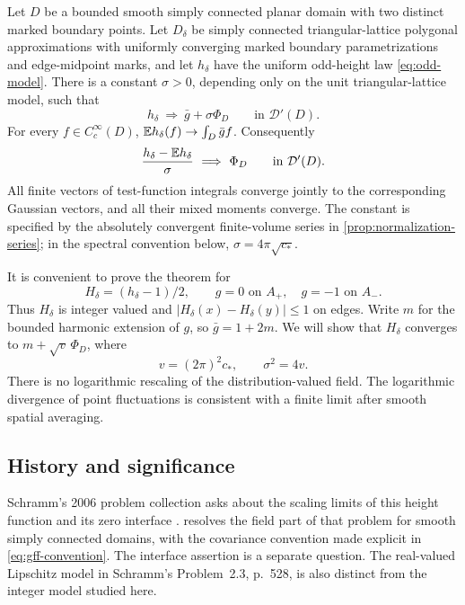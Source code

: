 \begin{theorem}\label{thm:main}
Let $D$ be a bounded smooth simply connected planar domain with two
distinct marked boundary points.  Let $D_\delta$ be simply connected
triangular-lattice polygonal approximations with uniformly converging
marked boundary parametrizations and edge-midpoint marks, and let
$h_\delta$ have the uniform odd-height law \eqref{eq:odd-model}.
There is a constant $\sigma>0$, depending only on the unit triangular-lattice
model, such that
\[
 h_\delta\ \Longrightarrow\ \bar g+\sigma\Phi_D
 \qquad\text{in }\mathcal D'(D).
\]
For every $f\in C_c^\infty(D)$, $\mathbb E h_\delta(f)\to\int_D\bar g f$.
Consequently
\begin{equation}\label{eq:main-centered}
 \frac{h_\delta-\mathbb E h_\delta}{\sigma}
 \ \Longrightarrow\ \Phi_D
 \qquad\text{in }\mathcal D'(D).
\end{equation}
All finite vectors of test-function integrals converge jointly to the
corresponding Gaussian vectors, and all their mixed moments converge.
The constant is specified by the absolutely convergent finite-volume series
in \cref{prop:normalization-series}; in the spectral convention below,
$\sigma=4\pi\sqrt{c_*}$.
\end{theorem}

It is convenient to prove the theorem for
\begin{equation}\label{eq:integer-height}
 H_\delta=(h_\delta-1)/2,
 \qquad g=0\text{ on }A_+,\quad g=-1\text{ on }A_-.
\end{equation}
Thus $H_\delta$ is integer valued and $|H_\delta(x)-H_\delta(y)|\le1$ on
edges.  Write $m$ for the bounded harmonic extension of $g$, so
$\bar g=1+2m$.  We will show that $H_\delta$ converges to
$m+\sqrt v\,\Phi_D$, where
\begin{equation}\label{eq:normalization-relations}
 v=(2\pi)^2c_*,\qquad \sigma^2=4v.
\end{equation}
There is no logarithmic rescaling of the distribution-valued field.  The
logarithmic divergence of point fluctuations is consistent with a finite
limit after smooth spatial averaging.

\subsection{History and significance}

Schramm's 2006 problem collection asks about the scaling limits of this
height function and its zero interface
\cite[Problem~2.2, p.~527]{Schramm2007}.
 resolves the field part of that problem for smooth simply
connected domains, with the covariance convention made explicit in
\eqref{eq:gff-convention}.  The
interface assertion is a separate question.  The real-valued Lipschitz
model in Schramm's Problem~2.3, p.~528, is also distinct from the integer model
studied here.

